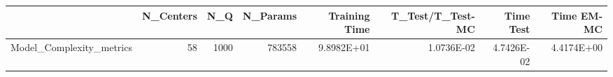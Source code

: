 \begin{tabular}{lrrrrrrr}
\toprule
{} &  N\_Centers &   N\_Q &  N\_Params &  Training Time &  T\_Test/T\_Test-MC &  Time Test &  Time EM-MC \\
\midrule
Model\_Complexity\_metrics &         58 &  1000 &    783558 &     9.8982E+01 &        1.0736E-02 & 4.7426E-02 &  4.4174E+00 \\
\bottomrule
\end{tabular}

